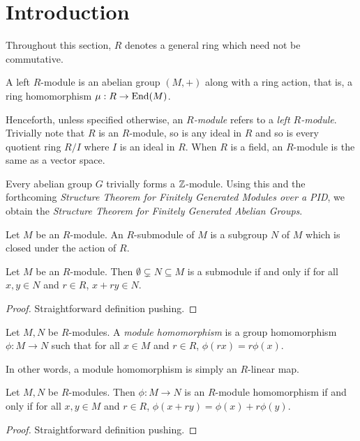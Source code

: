 \section{Introduction}
Throughout this section, $R$ denotes a general ring which need not be commutative.

\begin{definition}[Module]
    A left $R$-module is an abelian group $(M,+)$ along with a ring action, that is, a ring homomorphism $\mu: R\to\operatorname{End}(M)$.
\end{definition}

Henceforth, unless specified otherwise, an \textit{$R$-module} refers to a \textit{left $R$-module}. Trivially note that $R$ is an $R$-module, so is any ideal in $R$ and so is every quotient ring $R/I$ where $I$ is an ideal in $R$. When $R$ is a field, an $R$-module is the same as a vector space.

Every abelian group $G$ trivially forms a $\mathbb{Z}$-module. Using this and the forthcoming \textit{Structure Theorem for Finitely Generated Modules over a PID}, we obtain the \textit{Structure Theorem for Finitely Generated Abelian Groups}.

\begin{definition}[Submodule]
    Let $M$ be an $R$-module. An $R$-submodule of $M$ is a subgroup $N$ of $M$ which is closed under the action of $R$.
\end{definition}

\begin{proposition}
    Let $M$ be an $R$-module. Then $\emptyset\subsetneq N\subseteq M$ is a submodule if and only if for all $x,y\in N$ and $r\in R$, $x + ry\in N$.
\end{proposition}
\begin{proof}
    Straightforward definition pushing.
\end{proof}

\begin{definition}
    Let $M, N$ be $R$-modules. A \textit{module homomorphism} is a group homomorphism $\phi: M\to N$ such that for all $x\in M$ and $r\in R$, $\phi(rx) = r\phi(x)$.
\end{definition}

In other words, a module homomorphism is simply an $R$-linear map. 

\begin{proposition}
    Let $M, N$ be $R$-modules. Then $\phi: M\to N$ is an $R$-module homomorphism if and only if for all $x,y\in M$ and $r\in R$, $\phi(x + ry) = \phi(x) + r\phi(y)$.
\end{proposition}
\begin{proof}
    Straightforward definition pushing.
\end{proof}

